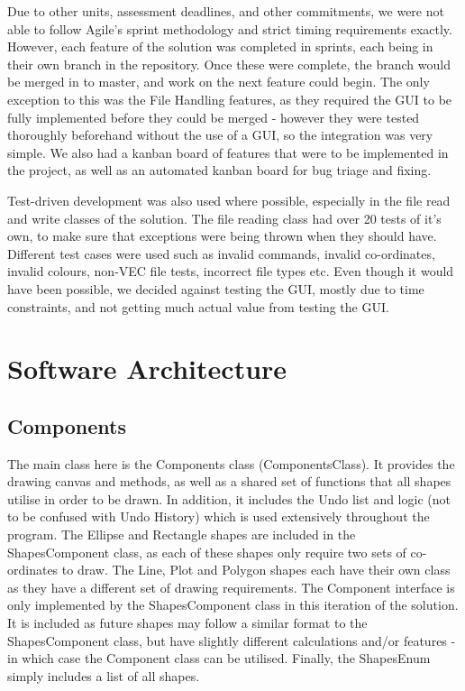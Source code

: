\documentclass[12pt]{article} %
\begin{document}
Due to other units, assessment deadlines, and other commitments, we were not able to follow Agile's sprint methodology and strict timing requirements exactly. However, each feature  of the solution was completed in sprints, each being in their own branch in the repository. Once these were complete, the branch would be merged in to master, and work on the next feature could begin. The only exception to this was the File Handling features, as they required the GUI to be fully implemented before they could be merged - however they were tested thoroughly beforehand without the use of a GUI, so the integration was very simple. We also had a kanban board of features that were to be implemented in the project, as well as an automated kanban board for bug triage and fixing.

Test-driven development was also used where possible, especially in the file read and write classes of the solution. The file reading class had over 20 tests of it's own, to make sure that exceptions were being thrown when they should have. Different test cases were used such as invalid commands, invalid co-ordinates, invalid colours, non-VEC file tests, incorrect file types etc. Even though it would have been possible, we decided against testing the GUI, mostly due to time constraints, and not getting much actual value from testing the GUI.


\newpage

\section{Software Architecture}

\subsection{Components}
The main class here is the Components class (ComponentsClass). It provides the drawing canvas and methods, as well as a shared set of functions that all shapes utilise in order to be drawn. In addition, it includes the Undo list and logic (not to be confused with Undo History) which is used extensively throughout the program. The Ellipse and Rectangle shapes are included in the ShapesComponent class, as each of these shapes only require two sets of co-ordinates to draw. The Line, Plot and Polygon shapes each have their own class as they have a different set of drawing requirements. The Component interface is only implemented by the ShapesComponent class in this iteration of the solution. It is included as future shapes may follow a similar format to the ShapesComponent class, but have slightly different calculations and/or features - in which case the Component class can be utilised. Finally, the ShapesEnum simply includes a list of all shapes.
\end{document}
